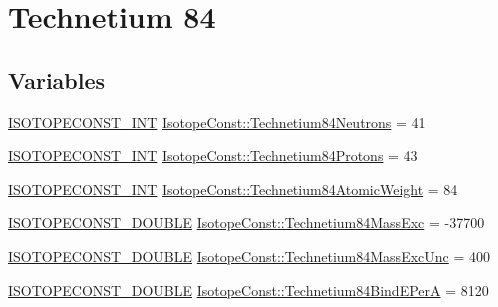 \hypertarget{group___isotope_const-_technetium-_tc84}{}\section{Technetium 84}
\label{group___isotope_const-_technetium-_tc84}
\subsection*{Variables}
\begin{DoxyCompactItemize}
\item 
\mbox{\hyperlink{group___isotope_const-_macros_ga5f18360b3e99483a35c32d789e62621c}{I\+S\+O\+T\+O\+P\+E\+C\+O\+N\+S\+T\+\_\+\+I\+NT}} \mbox{\hyperlink{group___isotope_const-_technetium-_tc84_ga5d8baa61c77b5664bbbb927e09a1a745}{Isotope\+Const\+::\+Technetium84\+Neutrons}} = 41
\item 
\mbox{\hyperlink{group___isotope_const-_macros_ga5f18360b3e99483a35c32d789e62621c}{I\+S\+O\+T\+O\+P\+E\+C\+O\+N\+S\+T\+\_\+\+I\+NT}} \mbox{\hyperlink{group___isotope_const-_technetium-_tc84_gafceef1a6c0174cc4e761d431b0141936}{Isotope\+Const\+::\+Technetium84\+Protons}} = 43
\item 
\mbox{\hyperlink{group___isotope_const-_macros_ga5f18360b3e99483a35c32d789e62621c}{I\+S\+O\+T\+O\+P\+E\+C\+O\+N\+S\+T\+\_\+\+I\+NT}} \mbox{\hyperlink{group___isotope_const-_technetium-_tc84_ga8607f9e3d6626f07a102288afa1c1a3f}{Isotope\+Const\+::\+Technetium84\+Atomic\+Weight}} = 84
\item 
\mbox{\hyperlink{group___isotope_const-_macros_ga8f45a7272ce02c0b4c65c44636ed719a}{I\+S\+O\+T\+O\+P\+E\+C\+O\+N\+S\+T\+\_\+\+D\+O\+U\+B\+LE}} \mbox{\hyperlink{group___isotope_const-_technetium-_tc84_ga52dd0b49c9615fb28cd341b2f66316e6}{Isotope\+Const\+::\+Technetium84\+Mass\+Exc}} = -\/37700
\item 
\mbox{\hyperlink{group___isotope_const-_macros_ga8f45a7272ce02c0b4c65c44636ed719a}{I\+S\+O\+T\+O\+P\+E\+C\+O\+N\+S\+T\+\_\+\+D\+O\+U\+B\+LE}} \mbox{\hyperlink{group___isotope_const-_technetium-_tc84_ga3e3c1e0646f5732c2284b86143b64eb6}{Isotope\+Const\+::\+Technetium84\+Mass\+Exc\+Unc}} = 400
\item 
\mbox{\hyperlink{group___isotope_const-_macros_ga8f45a7272ce02c0b4c65c44636ed719a}{I\+S\+O\+T\+O\+P\+E\+C\+O\+N\+S\+T\+\_\+\+D\+O\+U\+B\+LE}} \mbox{\hyperlink{group___isotope_const-_technetium-_tc84_ga438009eb91959b45c7e4b626ff66bf9b}{Isotope\+Const\+::\+Technetium84\+Bind\+E\+PerA}} = 8120
\item 

\end{DoxyCompactItemize}
